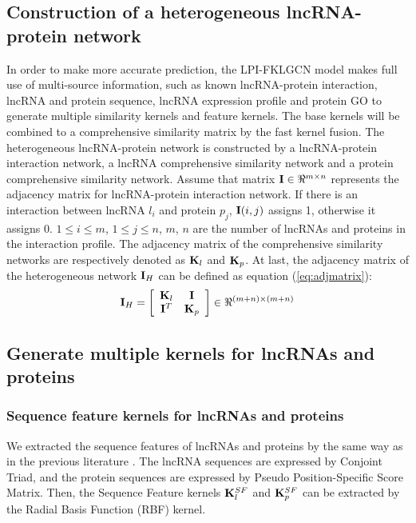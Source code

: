 \documentclass[fleqn,10pt]{wlscirep}
\begin{document}
\subsection*{Construction of a heterogeneous lncRNA-protein network}
In order to make more accurate prediction, the LPI-FKLGCN model makes full use of multi-source information, such as known lncRNA-protein interaction, lncRNA and protein sequence, lncRNA expression profile and protein GO to generate multiple similarity kernels and feature kernels. The base kernels will be combined to a comprehensive similarity matrix by the fast kernel fusion. The heterogeneous lncRNA-protein network is constructed by a lncRNA-protein interaction network, a lncRNA comprehensive similarity network and a protein comprehensive similarity network. Assume that matrix ${\bf{I}} \in {\Re ^{m \times n}}$ represents the adjacency matrix for lncRNA-protein interaction network. If there is an interaction between lncRNA ${{l_i}}$ and protein ${{p_j}}$, ${\bf{I}}(i,j)$ assigns 1, otherwise it assigns 0. $1 \le i \le m$, $1 \le j \le n$, $m$, $n$ are the number of lncRNAs and proteins in the interaction profile. The adjacency matrix of the comprehensive similarity networks are respectively denoted as ${{\bf{K}}_l}$ and ${{\bf{K}}_p}$. At last, the adjacency matrix of the heterogeneous network ${{\bf{I}}_H}$ can be defined as equation (\ref{eq:adjmatrix}):
\begin{equation}\label{eq:adjmatrix}
{{\bf{I}}_H} = \left[ {\begin{array}{*{20}{c}}
{{{\bf{K}}_l}}&{\bf{I}}\\
{{{\bf{I}}^T}}&{{{\bf{K}}_p}}
\end{array}} \right] \in {\Re ^{(m + n) \times (m + n)}}
\end{equation}
\subsection*{Generate multiple kernels for lncRNAs and proteins}
\subsubsection*{Sequence feature kernels for lncRNAs and proteins}
We extracted the sequence features of lncRNAs and proteins by the same way as in the previous literature \cite{Shen2019}. The lncRNA sequences are expressed by Conjoint Triad, and the protein sequences are expressed by Pseudo Position-Specific Score Matrix. Then, the Sequence Feature kernels ${\bf{K}}_l^{SF}$ and ${\bf{K}}_p^{SF}$ can be extracted by the Radial Basis Function (RBF) kernel.
\end{document}
